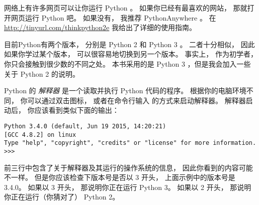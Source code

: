网络上有许多网页可以让你运行 Python 。  
如果你已经有最喜欢的网站， 那就打开网页运行 Python 吧。  
如果没有， 我推荐 PythonAnywhere 。  
在 \href{http://tinyurl.com/thinkpython2e}{http://tinyurl.com/thinkpython2e} 我给出了详细的使用指南。

\label{python_anywhere}


目前Python有两个版本， 分别是 Python 2 和 Python 3 。  
二者十分相似， 因此如果你学过某个版本， 可以很容易地切换到另一个版本。  
事实上， 作为初学者， 你只会接触到很少数的不同之处。  
本书采用的是 Python 3 ，但是我会加入一些关于 Python 2 的说明。



Python 的 {\em 解释器} 是一个读取并执行 Python 代码的程序。  
根据你的电脑环境不同， 你可以通过双击图标， 或者在命令行输入  的方式来启动解释器。  
解释器启动后， 你应该看到类似下面的输出：

\begin{lstlisting}
Python 3.4.0 (default, Jun 19 2015, 14:20:21)
[GCC 4.8.2] on linux
Type "help", "copyright", "credits" or "license" for more information.
>>>
\end{lstlisting}

%

前三行中包含了关于解释器及其运行的操作系统的信息， 因此你看到的内容可能不一样。  
但是你应该检查下版本号是否以 3 开头， 上面示例中的版本号是 3.4.0。  
如果以 3 开头， 那说明你正在运行 Python 3。  
如果以 2 开头， 那说明你正在运行（你猜对了） Python 2。

